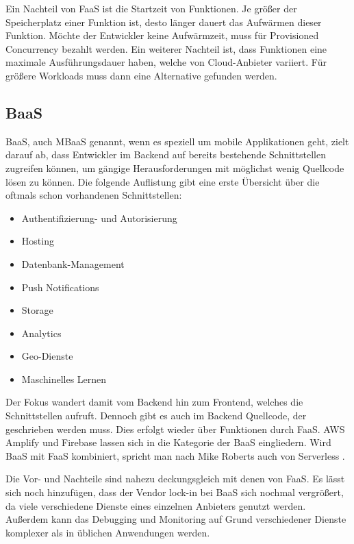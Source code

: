 Ein Nachteil von \ac{FaaS} ist die Startzeit von Funktionen. Je größer der Speicherplatz einer Funktion ist, desto länger dauert das Aufwärmen dieser Funktion. Möchte der Entwickler keine Aufwärmzeit, muss für Provisioned Concurrency bezahlt werden. Ein weiterer Nachteil ist, dass Funktionen eine maximale Ausführungsdauer haben, welche von Cloud-Anbieter variiert. Für größere Workloads muss dann eine Alternative gefunden werden.

\subsection{\acl{BaaS}}

\acf{BaaS}, auch \ac{MBaaS} genannt, wenn es speziell um mobile Applikationen geht, zielt darauf ab, dass Entwickler im Backend auf bereits bestehende Schnittstellen zugreifen können, um gängige Herausforderungen mit möglichst wenig Quellcode lösen zu können. Die folgende Auflistung gibt eine erste Übersicht über die oftmals schon vorhandenen Schnittstellen:
\begin{itemize}
  \item Authentifizierung- und Autorisierung
  \item Hosting
  \item Datenbank-Management
  \item Push Notifications
  \item Storage
  \item Analytics
  \item Geo-Dienste
  \item Maschinelles Lernen
\end{itemize}

Der Fokus wandert damit vom Backend hin zum Frontend, welches die Schnittstellen aufruft. Dennoch gibt es auch im Backend Quellcode, der geschrieben werden muss. Dies erfolgt wieder über Funktionen durch \ac{FaaS}. \ac{AWS} Amplify und Firebase lassen sich in die Kategorie der \ac{BaaS} eingliedern. Wird \ac{BaaS} mit \ac{FaaS} kombiniert, spricht man nach Mike Roberts auch von Serverless \autocite{brandon2017serverless}.

Die Vor- und Nachteile sind nahezu deckungsgleich mit denen von \ac{FaaS}. Es lässt sich noch hinzufügen, dass der Vendor lock-in bei \ac{BaaS} sich nochmal vergrößert, da viele verschiedene Dienste eines einzelnen Anbieters genutzt werden. Außerdem kann das Debugging und Monitoring auf Grund verschiedener Dienste komplexer als in üblichen Anwendungen werden.

